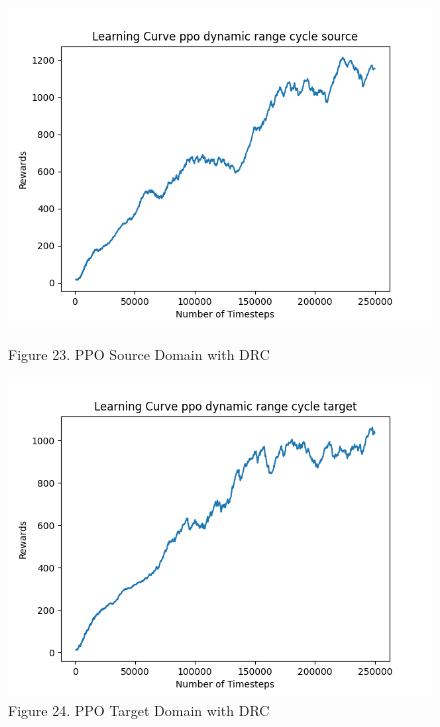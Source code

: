 \documentclass[12pt]{article}
\begin{document}
\begin{figure}[H]
    \vfill
    \begin{minipage}{0.45\textwidth}
        \centering
        \includegraphics[width=\textwidth]{../images/Learning_Curve_PPO_DRC_Source.png}
        \caption{Figure 23. PPO Source Domain with DRC}
        \label{fig:ppo_source_drc}
    \end{minipage}
    \hfill
    \begin{minipage}{0.45\textwidth}
        \centering
        \includegraphics[width=\textwidth]{../images/Learning_Curve_PPO_DRC_Target.png}
        \caption{Figure 24. PPO Target Domain with DRC}
        \label{fig:ppo_target_drc}
    \end{minipage}
\end{figure}
\end{document}
